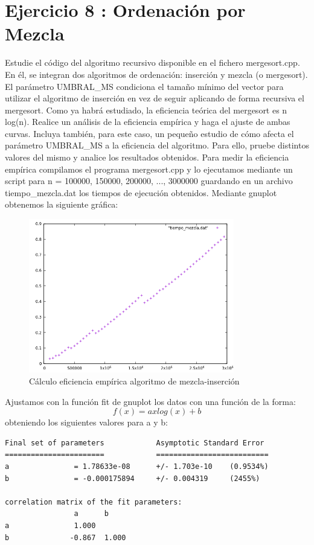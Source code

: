 \documentclass{article}
\begin{document}
\section{Ejercicio 8 : Ordenación por Mezcla}
Estudie el código del algoritmo recursivo disponible en el fichero mergesort.cpp. En él, se integran dos algoritmos de ordenación: inserción y mezcla (o mergesort). El parámetro UMBRAL\_MS condiciona el tamaño mínimo del vector para utilizar el algoritmo de inserción en vez de seguir aplicando de forma recursiva el mergesort. Como ya habrá estudiado, la eficiencia teórica del mergesort es n log(n). Realice un análisis de la
eficiencia empírica y haga el ajuste de ambas curvas. Incluya también, para este caso, un pequeño estudio de cómo afecta el parámetro UMBRAL\_MS a la eficiencia del algoritmo. Para ello, pruebe distintos valores del mismo y analice los resultados obtenidos.
\clearpage
Para medir la eficiencia empírica compilamos el programa mergesort.cpp y lo ejecutamos mediante un script para n = 100000, 150000, 200000, ..., 3000000 guardando en un archivo tiempo\_mezcla.dat los tiempos de ejecución obtenidos. Mediante gnuplot obtenemos la siguiente gráfica:
\begin{figure}[H]
  \caption{Cálculo eficiencia empírica algoritmo de mezcla-inserción}
  \centering
  \includegraphics[width=0.8\textwidth]{mergeemp.png}
\end{figure}
Ajustamos con la función fit de gnuplot los datos con una función de la forma:
\[
  f(x) = a x log(x) + b
\]
obteniendo los siguientes valores para a y b:
\begin{verbatim}
Final set of parameters            Asymptotic Standard Error
=======================            ==========================
a               = 1.78633e-08      +/- 1.703e-10    (0.9534%)
b               = -0.000175894     +/- 0.004319     (2455%)

correlation matrix of the fit parameters:
                a      b      
a               1.000 
b              -0.867  1.000 
\end{verbatim}
\end{document}
